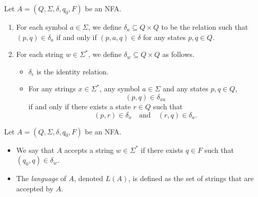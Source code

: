 \begin{definition}
  Let $A = (Q, \Sigma, \delta, q_0, F)$ be an NFA.
  \begin{enumerate}
    \item For each symbol $a \in \Sigma$, we define
    $\delta_a \subseteq Q \times Q$ to be the relation such that
    $(p, q) \in \delta_a$ if and only if $(p, a, q) \in \delta$ for any states
    $p, q \in Q$.
    \item For each string $w \in \Sigma^*$, we define
    $\delta_w \subseteq Q \times Q$ as follows.
    \begin{itemize}
      \item $\delta_\epsilon$ is the identity relation.
      \item For any strings $x \in \Sigma^*$, any symbol $a \in \Sigma$ and
      any states $p, q \in Q$,
      \begin{equation*}
        (p, q) \in \delta_{xa}
      \end{equation*}
      if and only if there exists a state $r \in Q$ such that
      \begin{equation*}
        (p, r) \in \delta_x \quad \text{and} \quad (r, q) \in \delta_a.
      \end{equation*}
    \end{itemize}
  \end{enumerate}
\end{definition}

\begin{definition}
  Let $A = (Q, \Sigma, \delta, q_0, F)$ be an NFA.
  \begin{itemize}
    \item We say that $A$ accepts a string $w \in \Sigma^*$ if there exists
    $q \in F$ such that $(q_0, q) \in \delta_w$.
    \item The \emph{language} of $A$, denoted $L(A)$, is defined as the set of
    strings that are accepted by $A$.
  \end{itemize}
\end{definition}

